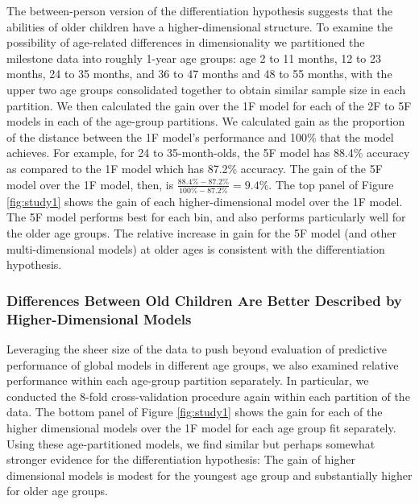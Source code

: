 \documentclass[man, floatsintext]{apa7}
\begin{document}
The between-person version of the differentiation
hypothesis suggests that the abilities of older children have a
higher-dimensional structure. To examine the possibility of age-related differences in dimensionality we partitioned
the milestone data into roughly 1-year age groups: age 2 to 11 months,
12 to 23 months, 24 to 35 months, and 36 to 47 months and 48 to 55
months, with the upper two age groups consolidated together to
obtain similar sample size in each partition. We then calculated the gain
over the 1F model for each of the 2F to 5F models in each of the age-group partitions.
We calculated gain as the proportion of the distance between the 1F
model's performance and 100\% that the model achieves. For example, for
24 to 35-month-olds, the 5F model has 88.4\% accuracy as compared to the
1F model which has 87.2\% accuracy. The gain of the 5F model over the 1F
model, then, is $\frac{88.4\% - 87.2\%}{100\% - 87.2\%} = 9.4\%$. The
top panel of Figure \ref{fig:study1} shows the gain of each
higher-dimensional model over the 1F model. The 5F model performs best
for each bin, and also performs particularly well for the older age
groups. The relative increase in gain for the 5F model (and other multi-dimensional models) at older ages is
consistent with the differentiation hypothesis.


\subsubsection{Differences Between Old Children Are Better Described by
Higher-Dimensional
Models}

Leveraging the sheer size of the data to push beyond evaluation of predictive performance of global models in different age groups, we also examined relative performance within each age-group partition separately. In particular, we conducted the 8-fold cross-validation procedure again within each partition of the data. The bottom panel of Figure \ref{fig:study1} shows the gain for
each of the higher dimensional models over the 1F model for each age
group fit separately. Using these age-partitioned models, we find similar but perhaps somewhat stronger evidence for the differentiation hypothesis: The gain of higher dimensional
models is modest for the youngest age group and substantially higher  for
older age groups.
\end{document}
